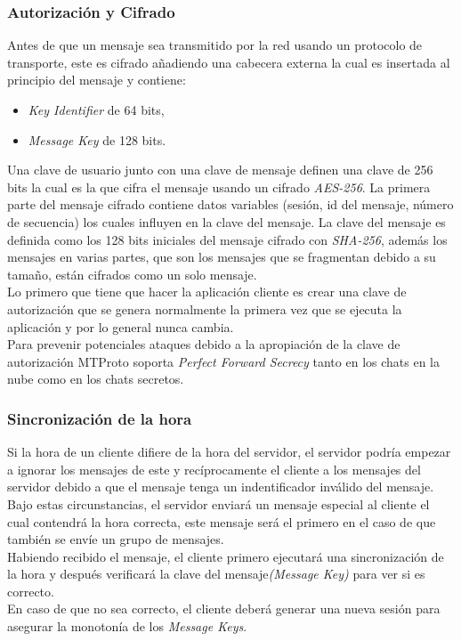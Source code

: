 \subsubsection{Autorización y Cifrado}
			Antes de que un mensaje sea transmitido por la red usando un protocolo de transporte, este es cifrado añadiendo una cabecera externa la cual es insertada al principio del mensaje y contiene:
	\begin{itemize}
		\item \emph{Key Identifier} de 64 bits,
		\item \emph{Message Key} de 128 bits.
	\end{itemize}
Una clave de usuario junto con una clave de mensaje definen una clave de 256 bits la cual es la que cifra el mensaje usando un cifrado \emph{AES-256}.
La primera parte del mensaje cifrado contiene datos variables (sesión, id del mensaje, número de secuencia) los cuales influyen en la clave del mensaje. La clave del mensaje es definida como los 128 bits iniciales del mensaje cifrado con \emph{SHA-256}, 
además los mensajes en varias partes, que son los mensajes que se fragmentan debido a su tamaño, están cifrados como un solo mensaje.\\
Lo primero que tiene que hacer la aplicación cliente es crear una clave de autorización que se genera normalmente la primera vez que se ejecuta la aplicación y por lo general nunca cambia.\\
Para prevenir potenciales ataques debido a la apropiación de la clave de autorización MTProto soporta \emph{Perfect Forward Secrecy} tanto en los chats en la nube como en los chats secretos.\\

\subsubsection{Sincronización de la hora}
Si la hora de un cliente difiere de la hora del servidor, el servidor podría empezar a ignorar los mensajes de este y recíprocamente el cliente a los mensajes del servidor debido a que el mensaje tenga un indentificador inválido del mensaje.\\
Bajo estas circunstancias, el servidor enviará un mensaje especial al cliente el cual contendrá la hora correcta, este mensaje será el primero en el caso de que también se envíe un grupo de mensajes.\\
Habiendo recibido el mensaje, el cliente primero ejecutará una sincronización de la hora y después verificará la clave del mensaje\emph{(Message Key)} para ver si es correcto.\\
En caso de que no sea correcto, el cliente deberá generar una nueva sesión para asegurar la monotonía de los \emph{Message Keys}.

